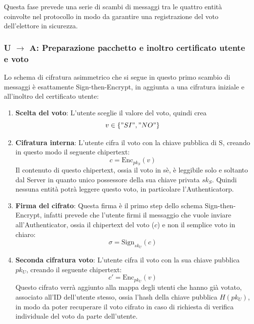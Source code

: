	Questa fase prevede una serie di scambi di messaggi tra le quattro entità coinvolte nel protocollo in modo da garantire una registrazione del voto dell'elettore in sicurezza.
	
	
	
	\subsubsection{U $\to$ A: Preparazione pacchetto e inoltro certificato utente e voto}
		Lo schema di cifratura asimmetrico che si segue in questo primo scambio di messaggi è esattamente Sign-then-Encrypt, in aggiunta a una cifratura iniziale e all'inoltro del certificato utente:
		
		\begin{enumerate}
			\item \textbf{Scelta del voto}: L'utente sceglie il valore del voto, quindi crea
			$$ v\in\{"SI","NO"\} $$
			
			\item \textbf{Cifratura interna}: L'utente cifra il voto con la chiave pubblica di S, creando in questo modo il seguente chipertext:
			$$ c = \text{Enc}_{pk_S}(v) $$
			Il contenuto di questo chipertext, ossia il voto in sè, è leggibile solo e soltanto dal Server in quanto unico possessore della sua chiave privata $sk_{S}$. Quindi nessuna entità potrà leggere questo voto, in particolare l'Authenticatorp.
			
			\item \textbf{Firma del cifrato}: Questa firma è il primo step dello schema Sign-then-Encrypt, infatti prevede che l'utente firmi il messaggio che vuole inviare all'Authenticator, ossia il chipertext del voto ($c$) e non il semplice voto in chiaro:
			$$ \sigma = \text{Sign}_{sk_U}(c) $$

			\item \textbf{Seconda cifratura voto}: L'utente cifra il voto con la sua chiave pubblica $pk_U$, creando il seguente chipertext:
			$$ c' = \text{Enc}_{pk_U}(v) $$
			Questo cifrato verrà aggiunto alla mappa degli utenti che hanno già votato, associato all'ID dell'utente stesso, ossia l'hash della chiave pubblica $H(pk_U)$, in modo da poter recuperare il voto cifrato in caso di richiesta di verifica individuale del voto da parte dell'utente.
			

\end{enumerate}
